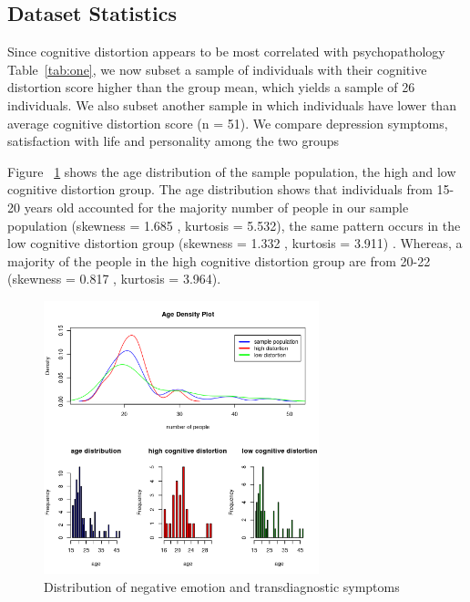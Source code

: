\subsection{Dataset Statistics}

Since cognitive distortion appears to be most correlated with psychopathology Table~\ref{tab:one}, we now subset a sample of individuals with their cognitive distortion score higher than the group mean, which yields a sample of 26 individuals. We also subset another sample in which individuals have lower than average cognitive distortion score (n = 51). We compare depression symptoms, satisfaction with life and personality among the two groups

Figure ~\ref{fig:two} shows the age distribution of the sample population, the high and low cognitive distortion group. The age distribution shows that individuals from 15-20 years old accounted for the majority number of people in our sample population (skewness = 1.685 , kurtosis = 5.532), the same pattern occurs in the low cognitive distortion group  (skewness = 1.332 , kurtosis = 3.911) . Whereas, a majority of the people in the high cognitive distortion group are from 20-22  (skewness = 0.817 , kurtosis = 3.964). 


\begin{figure}
  \includegraphics[width=80mm,scale=0.8]{fig2}
  \caption{Distribution of negative emotion and transdiagnostic symptoms}
  \label{fig:two}
\end{figure}


